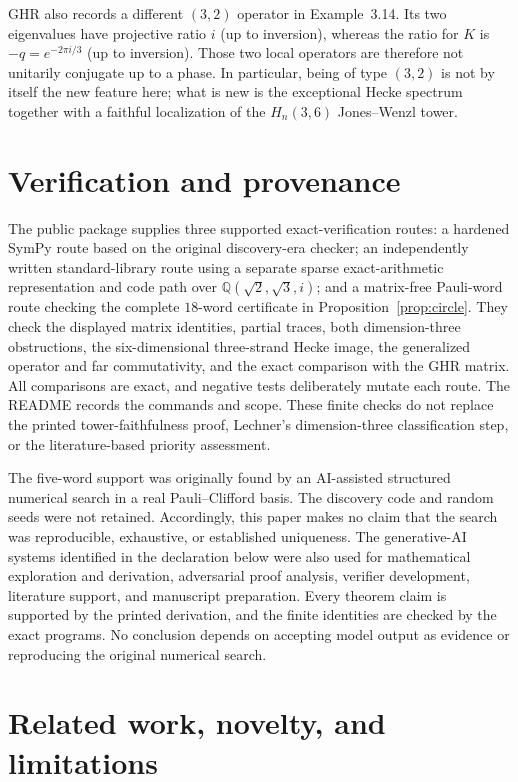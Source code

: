 \documentclass[11pt]{article}
\theoremstyle{remark}
\newcommand{\bbQ}{\mathbb Q}
\begin{document}
GHR also records a different \((3,2)\) operator in Example~3.14.  Its two
eigenvalues have projective ratio \(i\) (up to inversion), whereas the ratio
for \(K\) is \(-q=e^{-2\pi i/3}\) (up to inversion).  Those two local
operators are therefore not unitarily conjugate up to a phase.  In
particular, being of type \((3,2)\) is not by itself the new feature here;
what is new is the exceptional Hecke spectrum together with a faithful
localization of the \(H_n(3,6)\) Jones--Wenzl tower.

\section{Verification and provenance}\label{sec:verification}

The public package supplies three supported exact-verification routes: a
hardened SymPy route based on the original discovery-era checker; an
independently written standard-library route using a separate sparse
exact-arithmetic representation and code path over
\(\bbQ(\sqrt2,\sqrt3,i)\); and a matrix-free Pauli-word route checking the
complete \(18\)-word certificate in Proposition~\ref{prop:circle}.  They
check the displayed matrix identities, partial traces, both dimension-three
obstructions, the six-dimensional three-strand Hecke image, the generalized
operator and far commutativity, and the exact comparison with the GHR matrix.
All comparisons are exact, and negative tests deliberately mutate each route.
The README records the commands and scope.  These finite checks do not replace
the printed tower-faithfulness proof, Lechner's dimension-three classification
step, or the literature-based priority assessment.

The five-word support was originally found by an AI-assisted structured
numerical search in a real Pauli--Clifford basis.  The discovery code and
random seeds were not retained.  Accordingly, this paper makes no claim that
the search was reproducible, exhaustive, or established uniqueness.  The
generative-AI systems identified in the declaration below were also used for
mathematical exploration and derivation, adversarial proof analysis, verifier
development, literature support, and manuscript preparation.  Every theorem
claim is supported by the printed derivation, and the finite identities are
checked by the exact programs.  No conclusion depends on accepting model
output as evidence or reproducing the original numerical search.

\section{Related work, novelty, and limitations}\label{sec:priority}
\end{document}
